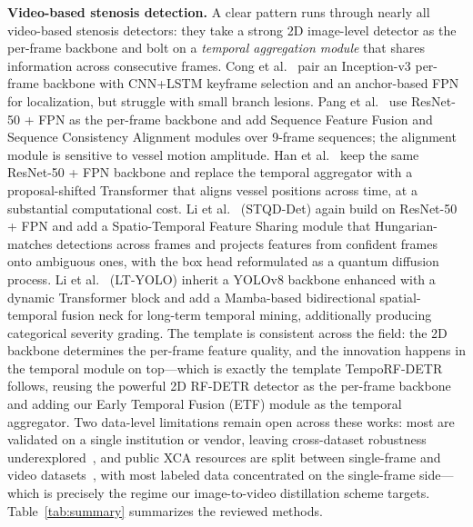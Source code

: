 \documentclass[conference]{IEEEtran}
\begin{document}
\textbf{Video-based stenosis detection.} A clear pattern runs through nearly all video-based stenosis detectors: they take a strong 2D image-level detector as the per-frame backbone and bolt on a \emph{temporal aggregation module} that shares information across consecutive frames. Cong et al.~\cite{fvcm} pair an Inception-v3 per-frame backbone with CNN+LSTM keyframe selection and an anchor-based FPN for localization, but struggle with small branch lesions. Pang et al.~\cite{PANG2021101900} use ResNet-50 + FPN as the per-frame backbone and add Sequence Feature Fusion and Sequence Consistency Alignment modules over 9-frame sequences; the alignment module is sensitive to vessel motion amplitude. Han et al.~\cite{HAN2023106546} keep the same ResNet-50 + FPN backbone and replace the temporal aggregator with a proposal-shifted Transformer that aligns vessel positions across time, at a substantial computational cost. Li et al.~\cite{STQD-Det} (STQD-Det) again build on ResNet-50 + FPN and add a Spatio-Temporal Feature Sharing module that Hungarian-matches detections across frames and projects features from confident frames onto ambiguous ones, with the box head reformulated as a quantum diffusion process. Li et al.~\cite{li2025ltyolo} (LT-YOLO) inherit a YOLOv8 backbone enhanced with a dynamic Transformer block and add a Mamba-based bidirectional spatial-temporal fusion neck for long-term temporal mining, additionally producing categorical severity grading. The template is consistent across the field: the 2D backbone determines the per-frame feature quality, and the innovation happens in the temporal module on top---which is exactly the template TempoRF-DETR follows, reusing the powerful 2D RF-DETR detector as the per-frame backbone and adding our Early Temporal Fusion (ETF) module as the temporal aggregator. Two data-level limitations remain open across these works: most are validated on a single institution or vendor, leaving cross-dataset robustness underexplored~\cite{cardiovascular}, and public XCA resources are split between single-frame and video datasets~\cite{jimenezpartinen2024cadica, popov2024arcade}, with most labeled data concentrated on the single-frame side---which is precisely the regime our image-to-video distillation scheme targets. Table~\ref{tab:summary} summarizes the reviewed methods.
\end{document}
